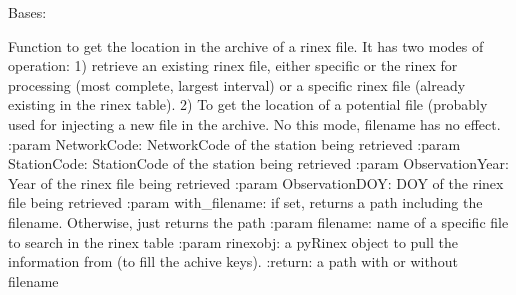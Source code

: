 \documentclass[letterpaper,10pt,english]{sphinxmanual}
\begin{document}
\begin{fulllineitems}
\label{\detokenize{pgamit.classes:pgamit.classes.pyArchiveStruct.RinexStruct}}
\pysigstartsignatures
\pysiglinewithargsret
{}
{}
{}
\pysigstopsignatures
\sphinxAtStartPar
Bases: 

\begin{fulllineitems}
\label{\detokenize{pgamit.classes:pgamit.classes.pyArchiveStruct.RinexStruct.build_rinex_path}}
\pysigstartsignatures
\pysiglinewithargsret
{}
{\sphinxparamcomma {}\sphinxparamcomma {}\sphinxparamcomma {}\sphinxparamcomma {}\sphinxparamcomma {}\sphinxparamcomma {}}
{}
\pysigstopsignatures
\sphinxAtStartPar
Function to get the location in the archive of a rinex file. It has two modes of operation:
1) retrieve an existing rinex file, either specific or the rinex for processing
(most complete, largest interval) or a specific rinex file (already existing in the rinex table).
2) To get the location of a potential file (probably used for injecting a new file in the archive. No this mode,
filename has no effect.
:param NetworkCode: NetworkCode of the station being retrieved
:param StationCode: StationCode of the station being retrieved
:param ObservationYear: Year of the rinex file being retrieved
:param ObservationDOY: DOY of the rinex file being retrieved
:param with\_filename: if set, returns a path including the filename. Otherwise, just returns the path
:param filename: name of a specific file to search in the rinex table
:param rinexobj: a pyRinex object to pull the information from (to fill the achive keys).
:return: a path with or without filename

\end{fulllineitems}



\end{fulllineitems}
\end{document}
